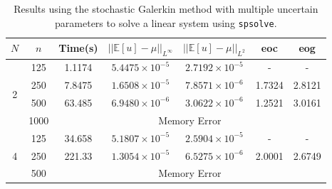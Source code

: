 \documentclass[11pt]{article}
\numberwithin{equation}{section}
\begin{document}
\begin{table}[H]
\centering
\begin{tabular}{|c|c|c|c|c|c|c|}
\hline
$N$ & $n$ & Time(s) & $|| \mathbb{E}[u] - \mu ||_{L^{\infty}}$ & $|| \mathbb{E}[u] - \mu ||_{L^{2}}$ & eoc & eog \\
\hline
\multirow{4}{*}{2} & 125 & 1.1174 & $5.4475 \times 10^{-5}$ & $2.7192 \times 10^{-5}$ & - & - \\
& 250 & 7.8475 & $1.6508 \times 10^{-5}$ & $7.8571 \times 10^{-6}$ & 1.7324 & 2.8121 \\
& 500 & 63.485 & $6.9480 \times 10^{-6}$ & $3.0622 \times 10^{-6}$ & 1.2521 & 3.0161 \\
\cline{3-7}
& 1000 & \multicolumn{5}{c|}{Memory Error} \\
\hline
\multirow{4}{*}{4} & 125 & 34.658 & $5.1807 \times 10^{-5}$ & $2.5904 \times 10^{-5}$ & - & - \\
& 250 & 221.33 & $1.3054 \times 10^{-5}$ & $6.5275 \times 10^{-6}$ & 2.0001 & 2.6749 \\
\cline{3-7}
& 500 & \multicolumn{5}{c|}{Memory Error} \\
\hline
\end{tabular}
\captionsetup{justification=centering}
\caption{Results using the stochastic Galerkin method with multiple uncertain parameters to solve a linear system using \texttt{spsolve}.}
\label{table:galerkin multiple linear}
\end{table}
\end{document}
